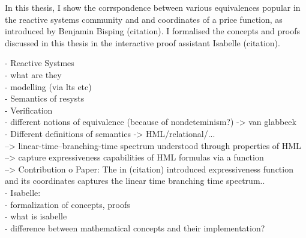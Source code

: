 %
\begin{isabellebody}%
%
%
\isadelimtheory
%
\endisadelimtheory
%
\isatagtheory
%
\endisatagtheory
{\isafoldtheory}%
%
\isadelimtheory
%
\endisadelimtheory
%
\isadelimdocument
%
\endisadelimdocument
%
\isatagdocument
%
\isamarkuptrue%
%
\endisatagdocument
{\isafolddocument}%
%
\isadelimdocument
%
\endisadelimdocument
%
\begin{isamarkuptext}%
In this thesis, I show the corrspondence between various equivalences popular in the reactive
systems community and and coordinates of a price function, as introduced by Benjamin Bisping (citation).
I formalised the concepts and proofs discussed in this thesis in the interactive proof assistant Isabelle (citation).

- Reactive Systmes \\
  - what are they \\
  - modelling (via lts etc) \\
  - Semantics of resysts \\
    - Verification \\
    - different notions of equivalence (because of nondeteminism?) -> van glabbeek \\
    - Different definitions of semantics -> HML/relational/... \\
 --> linear-time--branching-time spectrum understood through properties of HML \\
  --> capture expressiveness capabilities of HML formulas via a function \\
--> Contribution o Paper: The in (citation) introduced expressiveness function 
and its coordinates captures the linear time branching time spectrum.. \\
- Isabelle:\\
  - formalization of concepts, proofs \\
  - what is isabelle \\
  - difference between mathematical concepts and their implementation? \\%
\end{isamarkuptext}\isamarkuptrue%
%
\isadelimtheory
%
\endisadelimtheory
%
\isatagtheory
%
\endisatagtheory
{\isafoldtheory}%
%
\isadelimtheory
%
\endisadelimtheory
%
\end{isabellebody}%
\endinput
